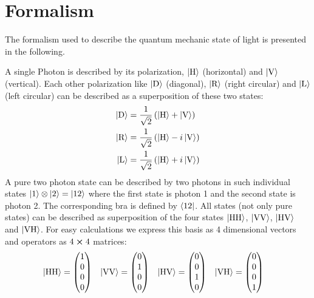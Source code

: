 \section{Formalism}
The formalism used to describe the quantum mechanic state of light is presented in the following.

A single Photon is described by its polarization, $\left|\text{H}\right\rangle$ (horizontal) and $\left|\text{V}\right\rangle$ (vertical).
Each other polarization like $\left|\text{D}\right\rangle$ (diagonal), $\left|\text{R}\right\rangle$ (right circular) and $\left|\text{L}\right\rangle$ (left circular) can be described as a superposition of these two states:
\begin{align}
\left|\text{D}\right\rangle
    &=\frac{1}{\sqrt{2}}\left(\left|\text{H}\right\rangle+\left|\text{V}\right\rangle\right)
    \label{eq:D}\\
\left|\text{R}\right\rangle
    &=\frac{1}{\sqrt{2}}\left(\left|\text{H}\right\rangle-i\left|\text{V}\right\rangle\right)
    \label{eq:R}\\
\left|\text{L}\right\rangle
    &=\frac{1}{\sqrt{2}}\left(\left|\text{H}\right\rangle+i\left|\text{V}\right\rangle\right)
    \label{eq:L}
\end{align}
A pure two photon state can be described by two photons in such individual states $\left|\text{1}\right\rangle\otimes\left|\text{2}\right\rangle=\left|\text{12}\right\rangle$ where the first state is photon 1 and the second state is photon 2.
The corresponding bra is defined by $\left\langle\text{12}\right|$.
All states (not only pure states) can be described as superposition of the four states $\left|\text{HH}\right\rangle$, $\left|\text{VV}\right\rangle$, $\left|\text{HV}\right\rangle$ and $\left|\text{VH}\right\rangle$.
For easy calculations we express this basis as 4 dimensional vectors and operators as $4\cross 4$ matrices:
\begin{align}
\left|\text{HH}\right\rangle
    &=\begin{pmatrix}1\\0\\0\\0\end{pmatrix}
    &\left|\text{VV}\right\rangle
    &=\begin{pmatrix}0\\1\\0\\0\end{pmatrix}
    &\left|\text{HV}\right\rangle
    &=\begin{pmatrix}0\\0\\1\\0\end{pmatrix}
    &\left|\text{VH}\right\rangle
    &=\begin{pmatrix}0\\0\\0\\1\end{pmatrix}
    \label{eq:basis}
\end{align}
